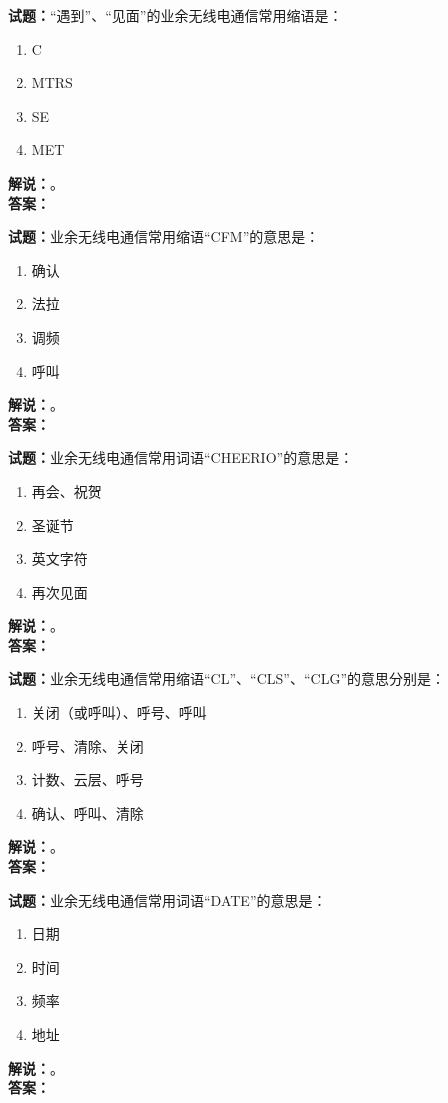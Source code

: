 \documentclass{ctexbook}
\begin{document}
\bigskip

\noindent\textbf{试题：}“遇到”、“见面”的业余无线电通信常用缩语是：
\begin{enumerate}[leftmargin=3em]
  \item C
  \item MTRS
  \item SE
  \item MET
\end{enumerate}
\noindent\textbf{解说：}\textbf{}。\\\noindent\textbf{答案：}

\bigskip

\noindent\textbf{试题：}业余无线电通信常用缩语“CFM”的意思是：
\begin{enumerate}[leftmargin=3em]
  \item 确认
  \item 法拉
  \item 调频
  \item 呼叫
\end{enumerate}
\noindent\textbf{解说：}\textbf{}。\\\noindent\textbf{答案：}

\bigskip

\noindent\textbf{试题：}业余无线电通信常用词语“CHEERIO”的意思是：
\begin{enumerate}[leftmargin=3em]
  \item 再会、祝贺
  \item 圣诞节
  \item 英文字符
  \item 再次见面
\end{enumerate}
\noindent\textbf{解说：}\textbf{}。\\\noindent\textbf{答案：}

\bigskip

\noindent\textbf{试题：}业余无线电通信常用缩语“CL”、“CLS”、“CLG”的意思分别是：
\begin{enumerate}[leftmargin=3em]
  \item 关闭（或呼叫）、呼号、呼叫
  \item 呼号、清除、关闭
  \item 计数、云层、呼号
  \item 确认、呼叫、清除
\end{enumerate}
\noindent\textbf{解说：}\textbf{}。\\\noindent\textbf{答案：}

\bigskip

\noindent\textbf{试题：}业余无线电通信常用词语“DATE”的意思是：
\begin{enumerate}[leftmargin=3em]
  \item 日期
  \item 时间
  \item 频率
  \item 地址
\end{enumerate}
\noindent\textbf{解说：}\textbf{}。\\\noindent\textbf{答案：}
\end{document}
